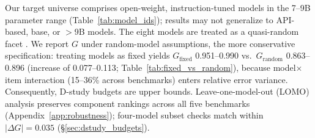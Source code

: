 Our target universe comprises open-weight, instruction-tuned models in the 7--9B parameter range (Table~\ref{tab:model_ids}); results may not generalize to API-based, base, or $>$9B models. The eight models are treated as a quasi-random facet \cite{meredith1993measurement, putnick2016measurement}. We report $G$ under random-model assumptions, the more conservative specification: treating models as fixed yields $G_\text{fixed}$ 0.951--0.990 vs.\ $G_\text{random}$ 0.863--0.896 (increase of 0.077--0.113; Table~\ref{tab:fixed_vs_random}), because model$\times$item interaction (15--36\% across benchmarks) enters relative error variance. Consequently, D-study budgets are upper bounds. Leave-one-model-out (LOMO) analysis preserves component rankings across all five benchmarks (Appendix~\ref{app:robustness}); four-model subset checks match within $|\Delta G| = 0.035$ (\S\ref{sec:dstudy_budgets}).
\label{sec:model_facet}
